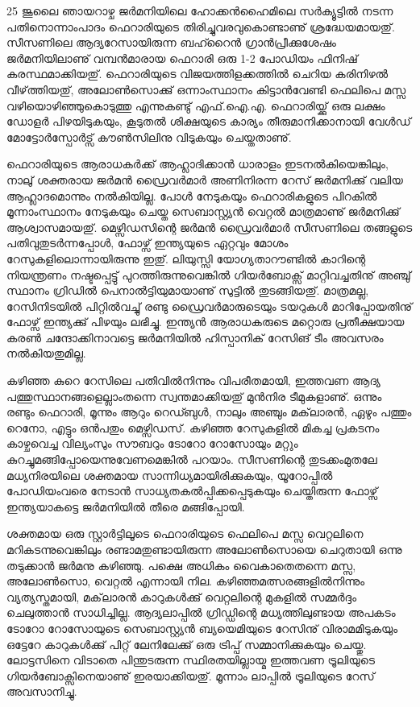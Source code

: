 ﻿
\vskip 2pt

25 ജൂലൈ ഞായറാഴ്ച ജര്‍മനിയിലെ ഹോക്കന്‍ഹൈമിലെ സര്‍ക്യൂട്ടില്‍ നടന്ന പതിനൊന്നാംപാദം ഫെറാരിയുടെ 
തിരിച്ചുവരവുകൊണ്ടാണു് ശ്രദ്ധേയമായതു്. സീസണിലെ ആദ്യറേസായിരുന്ന ബഹ്റൈന്‍ ഗ്രാന്‍പ്രീക്കുശേഷം 
ജര്‍മനിയിലാണു് വമ്പന്‍മാരായ ഫെറാരി ഒരു 1-2 പോഡിയം ഫിനിഷ് കരസ്ഥമാക്കിയതു്. ഫെറാരിയുടെ 
വിജയത്തിളക്കത്തില്‍ ചെറിയ കരിനിഴല്‍ വീഴ്‌ത്തിയതു്, അലോണ്‍സൊക്കു് ഒന്നാംസ്ഥാനം കിട്ടാന്‍വേണ്ടി ഫെലിപെ 
മസ്സ വഴിയൊഴിഞ്ഞുകൊടുത്തു എന്നുകണ്ടു് എഫ്.ഐ.എ. ഫെറാരിയ്ക്കു് ഒരു ലക്ഷം ഡോളര്‍ പിഴയിടുകയും, കൂടുതല്‍ 
ശിക്ഷയുടെ കാര്യം തീരുമാനിക്കാനായി വേള്‍ഡ് മോട്ടോര്‍സ്പോര്‍ട്സ് കൗണ്‍സിലിനു വിടുകയും ചെയ്തതാണു്.

ഫെറാരിയുടെ ആരാധകര്‍ക്ക് ആഹ്ലാദിക്കാന്‍ ധാരാളം ഇടനല്‍കിയെങ്കിലും, നാലു് ശക്തരായ ജര്‍മന്‍ ഡ്രൈവര്‍മാര്‍ 
അണിനിരന്ന റേസ് ജര്‍മനിക്കു് വലിയ ആഹ്ലാദമൊന്നും നല്‍കിയില്ല. പോള്‍ നേടുകയും ഫെറാരികളുടെ പിറകില്‍ 
മൂന്നാംസ്ഥാനം നേടുകയും ചെയ്ത സെബാസ്റ്റ്യന്‍ വെറ്റല്‍ മാത്രമാണു് ജര്‍മനിക്കു് ആശ്വാസമായതു്. മെഴ്സിഡസിന്റെ 
ജര്‍മന്‍ ഡ്രൈവര്‍മാര്‍ സീസണിലെ തങ്ങളുടെ പതിവുതുടര്‍ന്നപ്പോള്‍, ഫോഴ്സ് ഇന്ത്യയുടെ ഏറ്റവും മോശം 
റേസുകളിലൊന്നായിരുന്നു ഇതു്. ലിയുസ്സി യോഗ്യതാറൗണ്ടില്‍ കാറിന്റെ നിയന്ത്രണം നഷ്ടപ്പെട്ടു് പുറത്തിരുന്നുവെങ്കില്‍ 
ഗിയര്‍ബോക്സ് മാറ്റിവച്ചതിനു് അഞ്ചു് സ്ഥാനം ഗ്രിഡില്‍ പെനാല്‍ട്ടിയുമായാണു് സുട്ടില്‍ തുടങ്ങിയതു്. മാത്രമല്ല, 
റേസിനിടയില്‍ പിറ്റില്‍വച്ചു് രണ്ടു ഡ്രൈവര്‍മാരുടെയും ടയറുകള്‍ മാറിപ്പോയതിനു് ഫോഴ്സ് ഇന്ത്യക്കു് പിഴയും ലഭിച്ചു. 
ഇന്ത്യന്‍ ആരാധകരുടെ മറ്റൊരു പ്രതീക്ഷയായ കരണ്‍ ചന്ദോക്കിനാവട്ടെ ജര്‍മനിയില്‍ ഹിസ്പാനിക് റേസിങ് ടീം 
അവസരം നല്‍കിയതുമില്ല.

കഴിഞ്ഞ കുറെ റേസിലെ പതിവില്‍നിന്നും വിപരീതമായി, ഇത്തവണ ആദ്യ പത്തുസ്ഥാനങ്ങളെല്ലാംതന്നെ 
സ്വന്തമാക്കിയതു് മുന്‍നിര ടീമുകളാണു്. ഒന്നും രണ്ടും ഫെറാരി, മൂന്നും ആറും റെഡ്ബുള്‍, നാലും അഞ്ചും മക്‌ലാരന്‍, ഏഴും 
പത്തും റെനോ, എട്ടും ഒന്‍പതും മെഴ്സിഡസ്. കഴിഞ്ഞ റേസുകളില്‍ മികച്ച പ്രകടനം കാഴ്ചവെച്ച വില്യംസും സൗബറും 
ടോറോ റോസോയും മറ്റും കുറച്ചുമങ്ങിപ്പോയെന്നുവേണമെങ്കില്‍ പറയാം. സീസണിന്റെ തുടക്കംമുതലേ മധ്യനിരയിലെ 
ശക്തമായ സാന്നിധ്യമായിരിക്കുകയും, യൂറോപ്പില്‍ പോഡിയംവരെ നേടാന്‍ സാധ്യതകല്‍പ്പിക്കപ്പെടുകയും ചെയ്തിരുന്ന 
ഫോഴ്സ് ഇന്ത്യയാകട്ടെ ജര്‍മനിയില്‍ തീരെ മങ്ങിപ്പോയി.

ശക്തമായ ഒരു സ്റ്റാര്‍ട്ടിലൂടെ ഫെറാരിയുടെ ഫെലിപെ മസ്സ വെറ്റലിനെ മറികടന്നുവെങ്കിലും രണ്ടാമതുണ്ടായിരുന്ന 
അലോണ്‍സൊയെ ചെറുതായി ഒന്നു തടുക്കാന്‍ ജര്‍മനു കഴിഞ്ഞു. പക്ഷെ അധികം വൈകാതെതന്നെ മസ്സ, 
അലോണ്‍സൊ, വെറ്റല്‍ എന്നായി നില. കഴിഞ്ഞമത്സരങ്ങളില്‍നിന്നും വ്യത്യസ്തമായി, മക്‌ലാരന്‍ കാറുകള്‍ക്കു് വെറ്റലിന്റെ 
മുകളില്‍ സമ്മര്‍ദ്ദം ചെലുത്താന്‍ സാധിച്ചില്ല. ആദ്യലാപ്പില്‍ ഗ്രിഡ്ഡിന്റെ മധ്യത്തിലുണ്ടായ അപകടം ടോറോ റോസോയുടെ 
സെബാസ്റ്റ്യന്‍ ബ്യയെമിയുടെ റേസിനു് വിരാമമിടുകയും ഒട്ടേറേ കാറുകള്‍ക്കു് പിറ്റ് ലേനിലേക്കു് ഒരു ട്രിപ്പ് സമ്മാനിക്കുകയും 
ചെയ്തു. ലോട്ടസിനെ വിടാതെ പിന്തുടരുന്ന സ്ഥിരതയില്ലായ്മ ഇത്തവണ ട്രൂലിയുടെ ഗിയര്‍ബോക്സിനെയാണു് ഇരയാക്കിയതു്. 
മൂന്നാം ലാപ്പില്‍ ട്രൂലിയുടെ റേസ് അവസാനിച്ചു.

